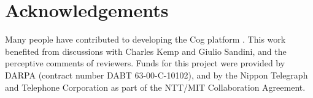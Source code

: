 
\section*{Acknowledgements}

Many people have contributed to developing the Cog platform
\cite{brooks99cog}.  This work benefited from discussions with Charles Kemp
and Giulio Sandini, and the perceptive comments of reviewers.  
Funds for this project were provided by DARPA 
(contract number DABT 63-00-C-10102), and by the
Nippon Telegraph and Telephone Corporation as part of the NTT/MIT
Collaboration Agreement.

